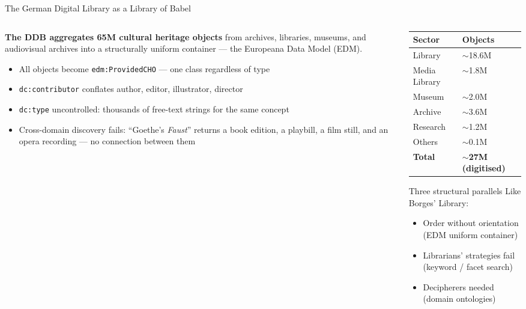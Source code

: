 \documentclass[xcolor,aspectratio=169,compress]{beamer}
\begin{document}
\begin{frame}{The German Digital Library as a Library of Babel}
  \begin{columns}
    \begin{column}{.52\textwidth}
      \textbf{The DDB aggregates 65M cultural heritage objects} from archives,
      libraries, museums, and audiovisual archives into a structurally uniform
      container --- the Europeana Data Model (EDM).
      \medskip

      \begin{itemize}\setlength{\itemsep}{4pt}
        \item All objects become \texttt{edm:ProvidedCHO} --- one class regardless of type
        \item \texttt{dc:contributor} conflates author, editor, illustrator, director
        \item \texttt{dc:type} uncontrolled: thousands of free-text strings for
              the same concept
        \item Cross-domain discovery fails: ``Goethe's \textit{Faust}'' returns a book
              edition, a playbill, a film still, and an opera recording ---
              no connection between them
      \end{itemize}
    \end{column}
    \begin{column}{.45\textwidth}
      \begin{tabular}{ll}
        \toprule
        Sector & Objects \\
        \midrule
        Library     & $\sim$18.6M \\
        Media Library & $\sim$1.8M \\
        Museum      & $\sim$2.0M \\
        Archive     & $\sim$3.6M \\
        Research    & $\sim$1.2M \\
        Others      & $\sim$0.1M \\
        \midrule
        \textbf{Total} & \textbf{$\sim$27M (digitised)} \\
        \bottomrule
      \end{tabular}
      \smallskip

      \begin{alertblock}{Three structural parallels}
        \footnotesize
        Like Borges' Library:
        \begin{itemize}\setlength{\itemsep}{1pt}
          \item Order without orientation (EDM uniform container)
          \item Librarians' strategies fail (keyword / facet search)
          \item Decipherers needed (domain ontologies)
        \end{itemize}
      \end{alertblock}
    \end{column}
  \end{columns}
\end{frame}
\end{document}
